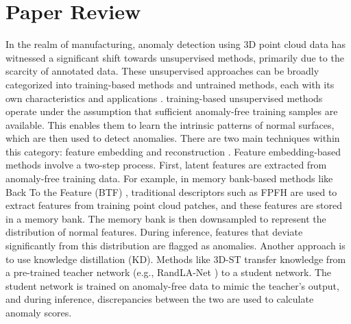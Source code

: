 \section{Paper Review}
In the realm of manufacturing, anomaly detection using 3D point cloud data has witnessed a significant shift towards unsupervised methods, primarily due to the scarcity of annotated data. These unsupervised approaches can be broadly categorized into training-based methods and untrained methods, each with its own characteristics and applications \cite{tao2023anomaly,cao_survey_2024,rani_advancements_2024}.
training-based unsupervised methods operate under the assumption that sufficient anomaly-free training samples are available. This enables them to learn the intrinsic patterns of normal surfaces, which are then used to detect anomalies. There are two main techniques within this category: feature embedding and reconstruction \cite{cao_complementary_2024,chu_shape-guided_2023,horwitz_back_2023,wang_multimodal_2023}.
Feature embedding-based methods involve a two-step process. First, latent features are extracted from anomaly-free training data. For example, in memory bank-based methods like Back To the Feature (BTF) \cite{horwitz_back_2023}, traditional descriptors such as FPFH are used to extract features from training point cloud patches, and these features are stored in a memory bank. The memory bank is then downsampled to represent the distribution of normal features. During inference, features that deviate significantly from this distribution are flagged as anomalies. Another approach is to use knowledge distillation (KD). Methods like 3D-ST \cite{bergmann_anomaly_2023} transfer knowledge from a pre-trained teacher network (e.g., RandLA-Net \cite{hu_learning_2022}) to a student network. The student network is trained on anomaly-free data to mimic the teacher's output, and during inference, discrepancies between the two are used to calculate anomaly scores.

